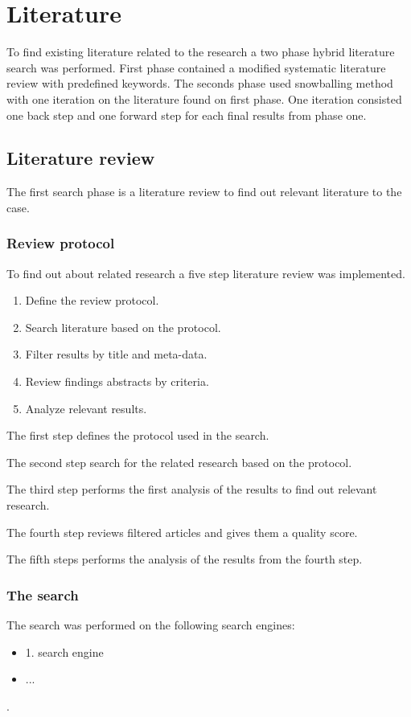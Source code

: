 \section{Literature}
To find existing literature related to the research a two phase hybrid literature search was performed.
First phase contained a modified systematic literature review with predefined keywords.
The seconds phase used snowballing method with one iteration on the literature found on first phase.
One iteration consisted one back step and one forward step for each final results from phase one.

\subsection{Literature review}
The first search phase is a literature review to find out relevant literature to the case.

\subsubsection{Review protocol}
To find out about related research a five step literature review was implemented.

\begin{enumerate}
    \item Define the review protocol.
    \item Search literature based on the protocol.
    \item Filter results by title and meta-data.
    \item Review findings abstracts by criteria.
    \item Analyze relevant results.
\end{enumerate}

The first step defines the protocol used in the search.

The second step search for the related research based on the protocol.

The third step performs the first analysis of the results to find out relevant research.

The fourth step reviews filtered articles and gives them a quality score.

The fifth steps performs the analysis of the results from the fourth step.

\subsubsection{The search}
The search was performed on the following search engines: 
\begin{itemize}
    \item 1. search engine
    \item ...
\end{itemize}.

